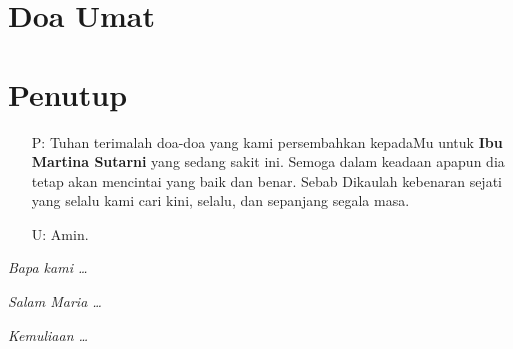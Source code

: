 \documentclass[a4paper,11point]{article}
\newcommand{\BU}[1]{\begin{itemize} \item[U:] #1 \end{itemize}}
\newcommand{\BP}[1]{\begin{itemize} \item[P:] #1 \end{itemize}}
\begin{document}
\section*{Doa Umat}

\section*{Penutup}
\BP{Tuhan terimalah doa-doa yang kami persembahkan kepadaMu untuk \textbf{Ibu Martina Sutarni} yang sedang sakit ini. Semoga dalam keadaan apapun dia tetap akan mencintai yang baik dan benar. Sebab Dikaulah kebenaran sejati yang selalu kami cari kini, selalu, dan sepanjang segala masa. }

\BU{Amin.}

\textit{Bapa kami \ldots}

\textit{Salam Maria \ldots}

\textit{Kemuliaan \ldots}
\end{document}
